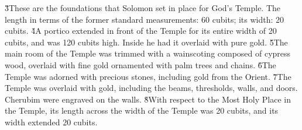 \v{3}These are the foundations that Solomon set in place for God's Temple. The length in terms of the former standard measurements: 60 cubits; its width: 20 cubits. \v{4}A portico extended in front of the Temple for its entire width of 20 cubits, and was 120 cubits high. Inside he had it overlaid with pure gold. \v{5}The main room of the Temple was trimmed with a wainscoting composed of cypress wood, overlaid with fine gold ornamented with palm trees and chains. \v{6}The Temple was adorned with precious stones, including gold from the Orient. \v{7}The Temple was overlaid with gold, including the beams, thresholds, walls, and doors. Cherubim were engraved on the walls. \v{8}With respect to the Most Holy Place in the Temple, its length across the width of the Temple was 20 cubits, and its width extended 20 cubits.


